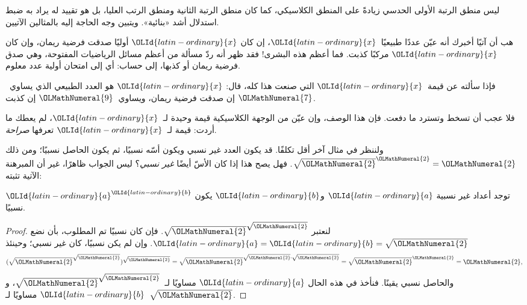 \documentclass[../../../include/open-logic-section]{subfiles}
\begin{document}


ليس منطق الرتبة الأولى الحدسي زيادةً على المنطق الكلاسيكي، كما
كان منطق الرتبة الثانية ومنطق الرتب العليا، بل هو تقييد له يراد به
ضبط استدلال أشد «بنائية». ويتبين وجه الحاجة إليه بالمثالين الآتيين.

هب أن آتيًا أخبرك أنه عيّن عددًا طبيعيًا~$\OLId{latin-ordinary}{x}$، إن كان $\OLId{latin-ordinary}{x}$ أوليًا
صدقت فرضية ريمان، وإن كان $\OLId{latin-ordinary}{x}$ مركبًا كذبت. فما أعظم هذه البشرى!{}
فقد ظهر أنه ردّ مسألة من أعظم مسائل الرياضيات المفتوحة، وهي صدق
فرضية ريمان أو كذبها، إلى حساب: أي إلى امتحان أولية عدد معلوم.

فإذا سألته عن قيمة~$\OLId{latin-ordinary}{x}$ التي صنعت هذا كله، قال: $\OLId{latin-ordinary}{x}$ هو العدد
الطبيعي الذي يساوي~$\OLMathNumeral{7}$ إن صدقت فرضية ريمان، ويساوي~$\OLMathNumeral{9}$ إن كذبت.

فلا عجب أن تسخط وتسترد ما دفعت. فإن هذا الوصف، وإن عيّن من الوجهة
الكلاسيكية قيمة وحيدة لـ~$\OLId{latin-ordinary}{x}$، لم يعطك ما أردت: قيمة لـ~$\OLId{latin-ordinary}{x}$
تعرفها \emph{صراحة}.

ولننظر في مثال آخر أقل تكلفًا. قد يكون العدد غير نسبي ويكون أسّه
نسبيًا، ثم يكون الحاصل نسبيًا؛ ومن ذلك $\sqrt{\OLMathNumeral{2}}^\OLMathNumeral{2} = \OLMathNumeral{2}$.
فهل يصح هذا إذا كان الأسّ أيضًا \emph{غير نسبي}؟ ليس الجواب
ظاهرًا، غير أن المبرهنة الآتية تثبته:

\begin{thm}
توجد أعداد غير نسبية $\OLId{latin-ordinary}{a}$ و$\OLId{latin-ordinary}{b}$ يكون $\OLId{latin-ordinary}{a}^\OLId{latin-ordinary}{b}$ نسبيًا.
\end{thm}

\begin{proof}
لنعتبر $\sqrt{\OLMathNumeral{2}}^{\sqrt{\OLMathNumeral{2}}}$. فإن كان نسبيًا تم المطلوب،
بأن نضع $\OLId{latin-ordinary}{a} = \OLId{latin-ordinary}{b} = \sqrt{\OLMathNumeral{2}}$. وإن لم يكن نسبيًا، كان غير نسبي؛ وحينئذ
\[
(\sqrt{\OLMathNumeral{2}}^{\sqrt{\OLMathNumeral{2}}})^{\sqrt{\OLMathNumeral{2}}} = \sqrt{\OLMathNumeral{2}}^{\sqrt{\OLMathNumeral{2}} \cdot
  \sqrt{\OLMathNumeral{2}}} = \sqrt{\OLMathNumeral{2}}^\OLMathNumeral{2} = \OLMathNumeral{2},
\]
والحاصل نسبي يقينًا. فنأخذ في هذه الحال $\OLId{latin-ordinary}{a}$ مساويًا
لـ~$\sqrt{\OLMathNumeral{2}}^{\sqrt{\OLMathNumeral{2}}}$، و$\OLId{latin-ordinary}{b}$ مساويًا لـ~$\sqrt \OLMathNumeral{2}$.
\end{proof}
\end{document}
